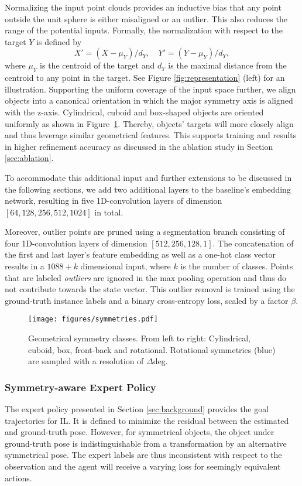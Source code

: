 \documentclass[10pt,twocolumn,letterpaper]{article}
\begin{document}
Normalizing the input point clouds provides an inductive bias that any point outside the unit sphere is either misaligned or an outlier. This also reduces the range of the potential inputs. Formally, the normalization with respect to the target $Y$ is defined by
\begin{equation}
    X' = (X - \mu_Y) / d_Y, \quad Y' = (Y - \mu_Y) / d_Y,
\end{equation}
where $\mu_Y$ is the centroid of the target and $d_Y$ is the maximal distance from the centroid to any point in the target. See Figure \ref{fig:representation} (left) for an illustration.
%
Supporting the uniform coverage of the input space further, we align objects into a canonical orientation in which the major symmetry axis is aligned with the z-axis. Cylindrical, cuboid and box-shaped objects are oriented uniformly as shown in Figure~\ref{fig:symmetries}. Thereby, objects' targets will more closely align and thus leverage similar geometrical features. This supports training and results in higher refinement accuracy as discussed in the ablation study in Section \ref{sec:ablation}.

To accommodate this additional input and further extensions to be discussed in the following sections, we add two additional layers to the baseline's embedding network, resulting in five 1D-convolution layers of dimension $[64,128,256,512,1024]$ in total.

Moreover, outlier points are pruned using a segmentation branch consisting of four 1D-convolution layers of dimension $[512,256,128,1]$. The concatenation of the first and last layer's feature embedding as well as a one-hot class vector results in a $1088+k$ dimensional input, where $k$ is the number of classes. Points that are labeled \textit{outliers} are ignored in the max pooling operation and thus do not contribute towards the state vector. This outlier removal is trained using the ground-truth instance labels and a binary cross-entropy loss, scaled by a factor $\beta$.

\begin{figure}
    \centering
    \texttt{[image: figures/symmetries.pdf]}
    \caption{Geometrical symmetry classes. From left to right: Cylindrical, cuboid, box, front-back and rotational. Rotational symmetries (blue) are sampled with a resolution of $\Delta$deg.}
    \label{fig:symmetries}
\end{figure}

\subsubsection{Symmetry-aware Expert Policy}
The expert policy presented in Section \ref{sec:background} provides the goal trajectories for IL. It is defined to minimize the residual between the estimated and ground-truth pose. However, for symmetrical objects, the object under ground-truth pose is indistinguishable from a transformation by an alternative symmetrical pose. The expert labels are thus inconsistent with respect to the observation and the agent will receive a varying loss for seemingly equivalent actions.
\end{document}
